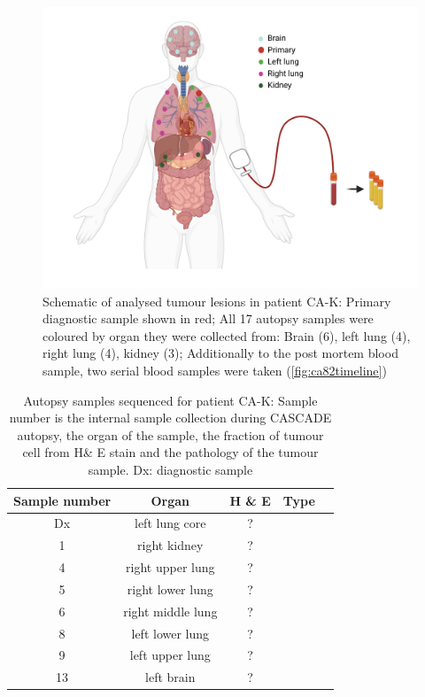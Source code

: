 \begin{figure}[ht]
\centering
\includegraphics[width=.99\linewidth]{Figures/CASCADE/CA82/CA-K_schematic_CA82_organColours}
\caption[Schematic of analysed tumour lesions in patient CA-K]{Schematic of analysed tumour lesions in patient CA-K: Primary diagnostic sample shown in red; All 17 autopsy samples were coloured by organ they were collected from: Brain (6), left lung (4), right lung (4), kidney (3); Additionally to the post mortem blood sample, two serial blood samples were taken (\protect\autoref{fig:ca82timeline})} \label{fig:ca82schematic}
\end{figure}

\begin{table}[ht]
\caption[Autopsy samples sequenced for patient CA-K]{Autopsy samples sequenced for patient CA-K: Sample number is the internal sample collection during CASCADE autopsy, the organ of the sample, the fraction of tumour cell from H\& E stain and the pathology of the tumour sample. Dx: diagnostic sample}\label{tab:ca82wgsSamples}
\centering
{}
\begin{tabular}{|c|c|c|c|c|}
\toprule
\hline
 \rowcolor{gray!50}
\textbf{Sample number} & \textbf{Organ} & \textbf{H \& E} & \textbf{Type}\\
\hline
 Dx & left lung core & ? & \cellcolor{white} \\
 1 & right kidney & ? & \cellcolor{white} \\
 4 & right upper lung & ? & \cellcolor{white} \\
 5 & right lower lung & ? & \cellcolor{white} \\
 6 & right middle lung & ? & \cellcolor{white} \\
 8 & left lower lung & ? & \cellcolor{white} \\
 9 & left upper lung & ? & \cellcolor{white} \\
 13 & left brain & ? & \cellcolor{white}\multirow{-7}{*}{adenocarcinoma} \\
 \hline
\bottomrule
\end{tabular}
\end{table} 


